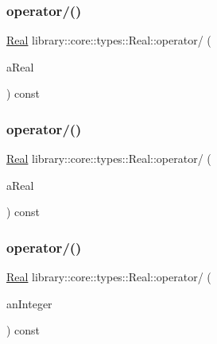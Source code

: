 \mbox{\label{classlibrary_1_1core_1_1types_1_1_real_a01f29a424bf2fafb8e22f4fbaaa4e46a}} 
\subsubsection{\texorpdfstring{operator/()}{operator/()}\hspace{0.1cm}{\footnotesize\ttfamily [1/3]}}
{\footnotesize\ttfamily \mbox{\hyperlink{classlibrary_1_1core_1_1types_1_1_real}{Real}} library\+::core\+::types\+::\+Real\+::operator/ (\begin{DoxyParamCaption}\item[{const \mbox{\hyperlink{classlibrary_1_1core_1_1types_1_1_real}{Real}} \&}]{a\+Real }\end{DoxyParamCaption}) const}

\mbox{\label{classlibrary_1_1core_1_1types_1_1_real_acd9a542764fae4b94bf4612affcfa701}} 
\subsubsection{\texorpdfstring{operator/()}{operator/()}\hspace{0.1cm}{\footnotesize\ttfamily [2/3]}}
{\footnotesize\ttfamily \mbox{\hyperlink{classlibrary_1_1core_1_1types_1_1_real}{Real}} library\+::core\+::types\+::\+Real\+::operator/ (\begin{DoxyParamCaption}\item[{const \mbox{\hyperlink{classlibrary_1_1core_1_1types_1_1_real_a9c5c8826b7e5a8e39544d23fea6c0e1c}{Real\+::\+Value\+Type}} \&}]{a\+Real }\end{DoxyParamCaption}) const}

\mbox{\label{classlibrary_1_1core_1_1types_1_1_real_adfd83fd099289cfee3ab553f33f00e41}} 
\subsubsection{\texorpdfstring{operator/()}{operator/()}\hspace{0.1cm}{\footnotesize\ttfamily [3/3]}}
{\footnotesize\ttfamily \mbox{\hyperlink{classlibrary_1_1core_1_1types_1_1_real}{Real}} library\+::core\+::types\+::\+Real\+::operator/ (\begin{DoxyParamCaption}\item[{const \mbox{\hyperlink{classlibrary_1_1core_1_1types_1_1_integer}{Integer}} \&}]{an\+Integer }\end{DoxyParamCaption}) const}

